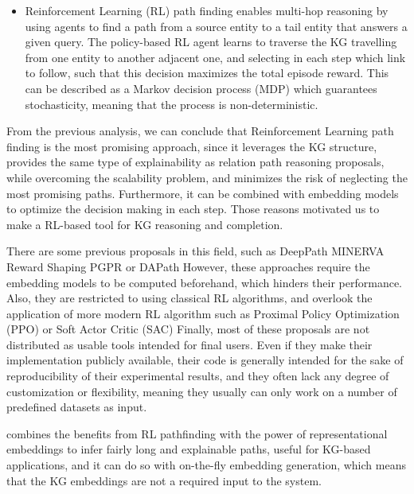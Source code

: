 \begin{itemize}
    \item Reinforcement Learning (RL) 
    path finding enables multi-hop reasoning by using agents to find a path from a source entity to a tail entity that answers a given query.
    The policy-based RL agent learns to traverse the KG travelling from one entity to another adjacent one, and selecting in each step which link to follow, such that this decision maximizes the total episode reward.
    This can be described as a Markov decision process (MDP) which guarantees stochasticity, meaning that the process is non-deterministic. 
\end{itemize}

From the previous analysis, we can conclude that Reinforcement Learning path finding is the most promising approach, since it leverages the KG structure,  provides the same type of explainability as relation path reasoning proposals, while overcoming the scalability problem, and minimizes the risk of neglecting the most promising paths. Furthermore, it can be combined with embedding models to optimize the decision making in each step. Those reasons motivated us to make \toolname{} a RL-based tool for KG reasoning and completion.

There are some previous proposals in this field, such as DeepPath
MINERVA 
Reward Shaping 
PGPR 
or DAPath 
However, these approaches require the embedding models to be computed beforehand, which hinders their performance. Also, they are restricted to using classical RL algorithms, and overlook the application of more modern RL algorithm such as Proximal Policy Optimization (PPO)
or Soft Actor Critic (SAC) 
Finally, most of these proposals are not distributed as usable tools intended for final users. Even if they make their implementation publicly available, their code is generally intended for the sake of reproducibility of their experimental results, and they often lack any degree of customization or flexibility, meaning they usually can only work on a number of predefined datasets as input.

\toolname{} combines the benefits from RL pathfinding with the power of representational embeddings to infer fairly long and explainable paths, useful for KG-based applications, and it can do so with on-the-fly embedding generation, which means that the KG embeddings are not a required input to the system.

